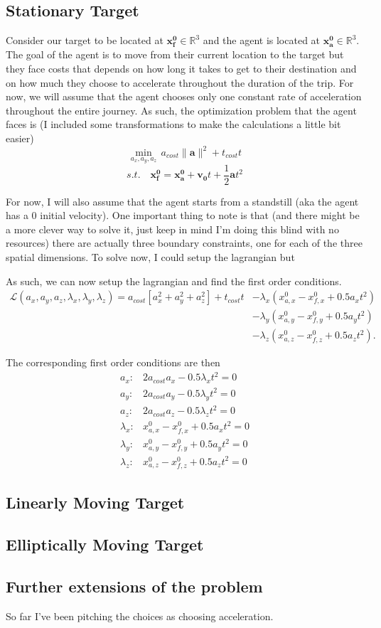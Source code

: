 \documentclass[11pt,english]{article}
\begin{document}
\subsection*{Stationary Target}

\noindent Consider our target to be located at $\mathbf{x_f^0}\in \mathbb{R}^3$ and the agent is located at $\mathbf{x_a^0}\in \mathbb{R}^3$. The goal of the agent is to move from their current location to the target but they face costs that depends on how long it takes to get to their destination and on how much they choose to accelerate throughout the duration of the trip. For now, we will assume that the agent chooses only one constant rate of acceleration throughout the entire journey. As such, the optimization problem that the agent faces is (I included some transformations to make the calculations a little bit easier) $$\min_{a_x,a_y,a_z}\,a_{cost}\lVert\mathbf{a}\rVert^2 + t_{cost}t$$ $$s.t. \quad \mathbf{x_f^0} = \mathbf{x_a^0} + \mathbf{v_0}t + \frac{1}{2}\mathbf{a}t^2$$

For now, I will also assume that the agent starts from a standstill (aka the agent has a 0 initial velocity). One important thing to note is that (and there might be a more clever way to solve it, just keep in mind I'm doing this blind with no resources) there are actually three boundary constraints, one for each of the three spatial dimensions. To solve now, I could setup the lagrangian but


As such, we can now setup the lagrangian and find the first order conditions.
\begin{align*}
	\mathcal{L}(a_x,a_y,a_z,\lambda_x,\lambda_y,\lambda_z) = a_{cost}\left[a_x^2 + a_y^2 + a_z^2\right] + t_{cost}t &- \lambda_x(x_{a,x}^0 - x_{f,x}^0 + 0.5a_xt^2)\\ &- \lambda_y(x_{a,y}^0 - x_{f,y}^0 + 0.5a_yt^2)\\ &- \lambda_z(x_{a,z}^0 - x_{f,z}^0 + 0.5a_zt^2).
\end{align*}

The corresponding first order conditions are then
\begin{align*}
a_x:& 2a_{cost}a_x - 0.5\lambda_xt^2 = 0\\
a_y:& 2a_{cost}a_y - 0.5\lambda_yt^2 = 0\\
a_z:& 2a_{cost}a_z - 0.5\lambda_zt^2 = 0\\
\lambda_x:& x_{a,x}^0 - x_{f,x}^0 + 0.5a_xt^2 = 0\\
\lambda_y:& x_{a,y}^0 - x_{f,y}^0 + 0.5a_yt^2 = 0\\
\lambda_z:& x_{a,z}^0 - x_{f,z}^0 + 0.5a_zt^2 = 0
\end{align*}

\subsection*{Linearly Moving Target}


\subsection*{Elliptically Moving Target}


\subsection*{Further extensions of the problem}

So far I've been pitching the choices as choosing acceleration.
\end{document}
